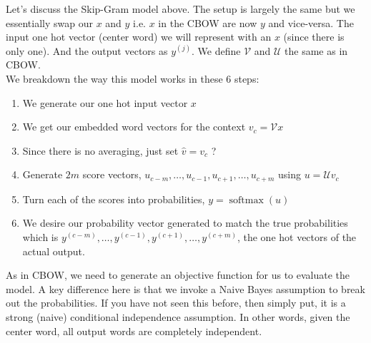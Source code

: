 \documentclass{tufte-handout}
\begin{document}
Let's discuss the Skip-Gram model above. The setup is largely the same but we essentially swap our $x$ and $y$ i.e. $x$ in the CBOW are now $y$ and vice-versa. The input one hot vector (center word) we will represent with an $x$ (since there is only one). And the output vectors as $y^{(j)}$. We define $\mathcal{V}$ and $\mathcal{U}$ the same as in CBOW.
\vspace{-.5cm}
$$ $$
We breakdown the way this model works in these 6 steps:
\begin{enumerate}
\item We generate our one hot input vector $x$
\item We get our embedded word vectors for the context $v_{c} =\mathcal{V}x$
\item Since there is no averaging, just set $\hat{v} = v_{c}$
?\item Generate $2m$ score vectors, $u_{c-m}, \hdots, u_{c-1}, u_{c+1}, \hdots, u_{c+m}$ using $u=\mathcal{U}v_{c}$
\item Turn each of the scores into probabilities, $y = \operatorname{softmax}(u)$
\item We desire our probability vector generated to match the true probabilities which is
$y^{(c-m)}, \hdots, y^{(c-1)}, y^{(c+1)}, \hdots, y^{(c+m)}$, the one hot vectors of the actual output.
\end{enumerate}

As in CBOW, we need to generate an objective function for us to evaluate the model. A key difference here is that we invoke a Naive Bayes assumption to break out the probabilities. If you have not seen this before, then simply put, it is a strong (naive) conditional independence assumption. In other words, given the center word, all output words are completely independent.
\end{document}

